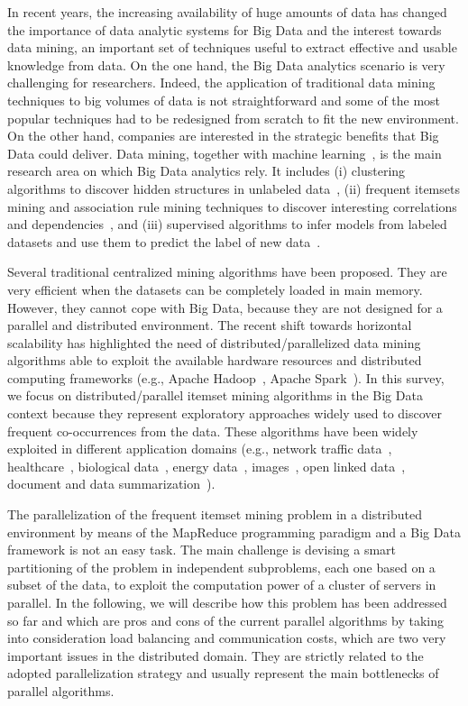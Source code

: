 In recent years, the increasing availability of huge amounts of data has changed the importance of
data analytic systems for Big Data and the interest towards data mining, an important set of techniques useful to extract effective and usable knowledge
from data.
On the one hand, the Big Data analytics scenario is very challenging for researchers. Indeed, 
the application of traditional data mining techniques to big
volumes of data is not straightforward and 
some of the most popular techniques had to be redesigned from
scratch to fit the new environment.
On the other hand, companies are
interested in the strategic benefits that Big Data could deliver.
Data mining, together with machine learning~\cite{DBLP:journals/bdr/Al-JarrahYMKT15}, is the main research area on which Big Data analytics
rely. It includes (i) clustering
algorithms to discover hidden structures in unlabeled
data~\cite{Xu_2005SurveyClustering}, (ii) frequent itemsets mining and association
rule mining techniques to discover interesting correlations and
dependencies~\cite{Han_2007SurveyFIM}, and (iii) supervised algorithms 
to infer models from labeled datasets and use them to predict the label of new data~\cite{AggarwalBookClassification}.

Several traditional centralized mining algorithms have been proposed. They are very efficient when the datasets can be completely loaded in 
main memory. However, they cannot cope with Big Data, because they are not designed for a parallel and distributed environment.  
The recent shift towards horizontal scalability has highlighted the need of
distributed/parallelized data mining algorithms able to exploit the available hardware resources and 
distributed computing frameworks (e.g., Apache Hadoop~\cite{HDFS}, Apache Spark~\cite{Zaharia_spark}).
In this survey, we focus on distributed/parallel itemset mining algorithms in the Big Data context because they
represent exploratory approaches widely used to discover frequent co-occurrences from the data. 
These algorithms have been widely exploited in different
application domains (e.g., network traffic data~\cite{ApilettiBCCG13},
healthcare~\cite{META-TIST-2015}, biological data~\cite{DBLP:conf/sigmod/CongXPTY04}, energy
data~\cite{NostroENDM2016_senzacrossref}, images~\cite{zaianeimage},  open
linked data~\cite{BCOpenLinkedData}, document and data summarization~\cite{BaralisCFG15,DBLP:journals/cg/LopesPPM07,Mampaey:2011:TMI:2020408.2020499}).

The parallelization of the frequent itemset mining problem in a distributed environment by means of the MapReduce programming paradigm and a Big Data framework
is not an easy task. The main challenge is devising a smart partitioning of the problem in independent subproblems, each one based on a subset of the data, to exploit the computation power of a cluster of servers in parallel. In the following, we will describe how this problem has been addressed so far and which are pros and cons of the current parallel algorithms by taking into consideration load balancing and communication costs, which are two very important issues in the distributed domain. 
They are strictly related to the adopted parallelization strategy and usually represent the main bottlenecks of parallel algorithms.

